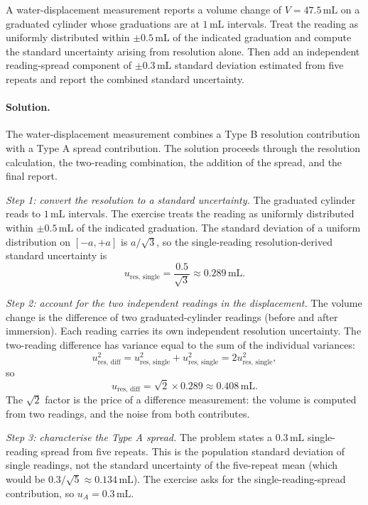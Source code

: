 \begin{exercise}
A water-displacement measurement reports a volume change of
$V = 47.5 \,\si{\milli\liter}$ on a graduated cylinder whose
graduations are at $1 \,\si{\milli\liter}$ intervals. Treat the
reading as uniformly distributed within $\pm 0.5 \,\si{\milli\liter}$
of the indicated graduation and compute the standard uncertainty
arising from resolution alone. Then add an independent reading-spread
component of $\pm 0.3 \,\si{\milli\liter}$ standard deviation
estimated from five repeats and report the combined standard
uncertainty.
\end{exercise}

\paragraph{Solution.}
The water-displacement measurement combines a Type B resolution
contribution with a Type A spread contribution. The solution
proceeds through the resolution calculation, the two-reading
combination, the addition of the spread, and the final report.

\emph{Step 1: convert the resolution to a standard uncertainty.}
The graduated cylinder reads to $1\,\si{\milli\liter}$ intervals.
The exercise treats the reading as uniformly distributed within
$\pm 0.5\,\si{\milli\liter}$ of the indicated graduation. The
standard deviation of a uniform distribution on $[-a, +a]$ is
$a/\sqrt{3}$, so the single-reading resolution-derived standard
uncertainty is
\[
u_{\text{res, single}} = \frac{0.5}{\sqrt{3}} \approx 0.289\,\si{
\milli\liter}.
\]

\emph{Step 2: account for the two independent readings in the
displacement.} The volume change is the difference of two
graduated-cylinder readings (before and after immersion). Each
reading carries its own independent resolution uncertainty. The
two-reading difference has variance equal to the sum of the
individual variances:
\[
u_{\text{res, diff}}^{2} = u_{\text{res, single}}^{2} +
u_{\text{res, single}}^{2} = 2 u_{\text{res, single}}^{2},
\]
so
\[
u_{\text{res, diff}} = \sqrt{2} \times 0.289 \approx 0.408\,\si{
\milli\liter}.
\]
The $\sqrt{2}$ factor is the price of a difference measurement: the
volume is computed from two readings, and the noise from both
contributes.

\emph{Step 3: characterise the Type A spread.} The problem states a
$0.3\,\si{\milli\liter}$ single-reading spread from five repeats.
This is the population standard deviation of single readings, not
the standard uncertainty of the five-repeat mean (which would be
$0.3/\sqrt{5} \approx 0.134\,\si{\milli\liter}$). The exercise
asks for the single-reading-spread contribution, so $u_{A} =
0.3\,\si{\milli\liter}$.

